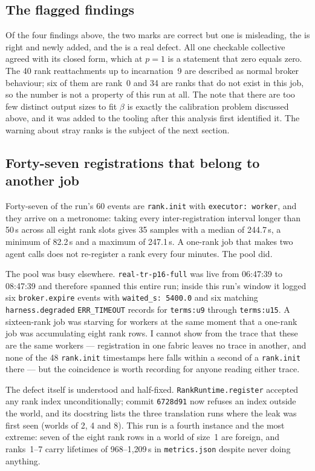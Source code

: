 \documentclass[11pt]{article}
\begin{document}
\subsection*{The flagged findings}

Of the four findings above, the two  marks are correct but one is misleading, the
 is right and newly added, and the  is a real defect. All one
checkable collective agreed with its closed form, which at $p=1$ is a statement that zero
equals zero. The 40 rank reattachments up to incarnation~9 are described as normal broker
behaviour; six of them are rank~0 and 34 are ranks that do not exist in this job, so the
number is not a property of this run at all. The note that there are too few distinct output
sizes to fit $\beta$ is exactly the calibration problem discussed above, and it was added to
the tooling after this analysis first identified it. The warning about stray ranks is the
subject of the next section.

\subsection*{Forty-seven registrations that belong to another job}
\label{sec:strays}

Forty-seven of the run's 60 events are \texttt{rank.init} with \texttt{executor: worker}, and
they arrive on a metronome: taking every inter-registration interval longer than 50\,s across
all eight rank slots gives 35 samples with a median of 244.7\,s, a minimum of 82.2\,s and a
maximum of 247.1\,s. A one-rank job that makes two agent calls does not re-register a rank
every four minutes. The pool did.

The pool was busy elsewhere. \texttt{real-tr-p16-full} was live from 06:47:39 to 08:47:39 and
therefore spanned this entire run; inside this run's window it logged six
\texttt{broker.expire} events with \texttt{waited\_s: 5400.0} and six matching
\texttt{harness.degraded} \texttt{ERR\_TIMEOUT} records for \texttt{terms:u9} through
\texttt{terms:u15}. A sixteen-rank job was starving for workers at the same moment that a
one-rank job was accumulating eight rank rows. I cannot show from the trace that these are the
same workers --- registration in one fabric leaves no trace in another, and none of the 48
\texttt{rank.init} timestamps here falls within a second of a \texttt{rank.init} there --- but
the coincidence is worth recording for anyone reading either trace.

The defect itself is understood and half-fixed. \texttt{RankRuntime.register} accepted any
rank index unconditionally; commit \texttt{6728d91} now refuses an index outside the world,
and its docstring lists the three translation runs where the leak was first seen (worlds of 2,
4 and 8). This run is a fourth instance and the most extreme: seven of the eight rank rows in
a world of size~1 are foreign, and ranks~1--7 carry lifetimes of 968--1{,}209\,s in
\texttt{metrics.json} despite never doing anything.
\end{document}
